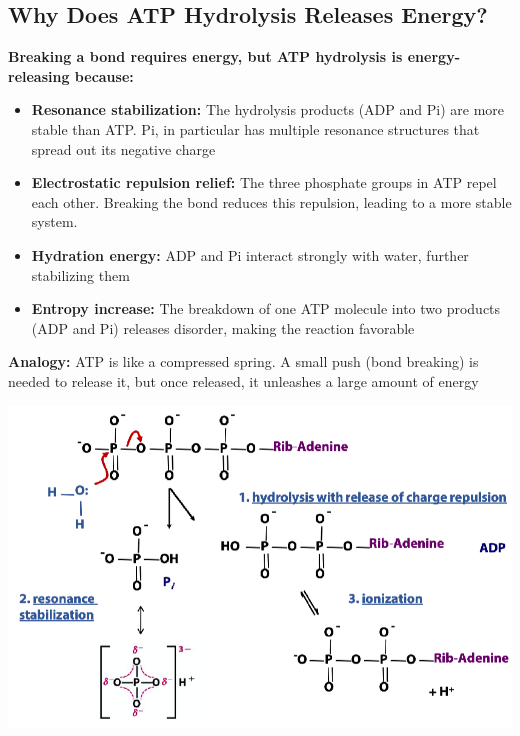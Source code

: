 \documentclass[10pt]{article}
\begin{document}
\subsection*{Why Does ATP Hydrolysis Releases Energy?}
\textbf{Breaking a bond requires energy, but ATP hydrolysis is energy-releasing because:}
\begin{itemize}
	\item \textbf{Resonance stabilization:} The hydrolysis products (ADP and Pi) are more stable than ATP.  Pi, in particular has multiple resonance structures that spread out its negative charge
    \item \textbf{Electrostatic repulsion relief:} The three phosphate groups in ATP repel each other.  Breaking the bond reduces this repulsion, leading to a more stable system.
    \item \textbf{Hydration energy:} ADP and Pi interact strongly with water, further stabilizing them
    \item \textbf{Entropy increase:}  The breakdown of one ATP molecule into two products (ADP and Pi) releases disorder, making the reaction favorable
\end{itemize}
\textbf{Analogy:} ATP is like a compressed spring.  A small push (bond breaking) is needed to release it, but once released, it unleashes a large amount of energy
\begin{center} 
	\includegraphics*[scale=0.6]{L2_7.png}
\end{center}
\end{document}
